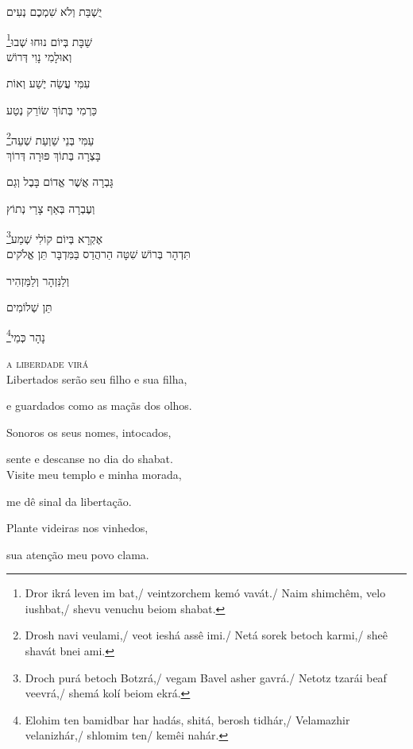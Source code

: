 יֻשְׁבַּת וְלֹא שִׁמְכֶם נְעִים

\footnote{Dror ikrá leven im bat,/ veintzorchem kemó vavát./ Naim shimchêm, velo iushbat,/ shevu venuchu beiom shabat.}שַׁבָּת בְּיוֹם נוּחוּ שְׁבוּ\\[10pt]


וְאוּלָמִי נָוִי דְּרוֹשׁ

עִמִּי עֲשֵׂה יֶשַׁע וְאוֹת

כַּרְמִי בְּתוֹךְ שׂוֹרֵק נְטַע

\footnote{Drosh navi veulami,/ veot ieshá assê imi./ Netá sorek betoch karmi,/ sheê shavát bnei ami.}עַמִּי בְּנֵי שַׁוְעַת שְׁעֵה\\[10pt]



בָּצְרָה בְּתוֹךְ פּוּרָה דְּרוֹךְ

גָּבְרָה אֲשֶׁר אֱדוֹם בָּבֶל וְגַם

וְעֶבְרָה בְּאַף צָרַי נְתוֹץ

\footnote{Droch purá betoch Botzrá,/ vegam Bavel asher gavrá./ Netotz tzarái beaf veevrá,/ shemá kolí beiom ekrá.}אֶקְרָא בְּיוֹם קוֹלִי שְׁמַע\\[10pt]


תִּדְהָר בְּרוֹשׁ שִׁטָּה הַרהֲדַס בַּמִּדְבָּר תֵּן אֱלֹקים

וְלַנִּזְהָר וְלַמַּזְהִיר

תֵּן שְׁלוֹמִים

\footnote{Elohim ten bamidbar har hadás, shitá, berosh tidhár,/ Velamazhir velanizhár,/ shlomim ten/ kemêi nahár.}נָהָר כְּמֵי\\[10pt]


\movetooddpage
\raggedright

\vspace*{1cm}

\textsc{a liberdade virá}\\[15pt]


Libertados serão seu filho e sua filha,

e guardados como as maçãs dos olhos.

Sonoros os seus nomes, intocados,

sente e descanse no dia do shabat.\\[10pt]


Visite meu templo e minha morada,

me dê sinal da libertação.

Plante videiras nos vinhedos,

sua atenção meu povo clama.\\[10pt]


